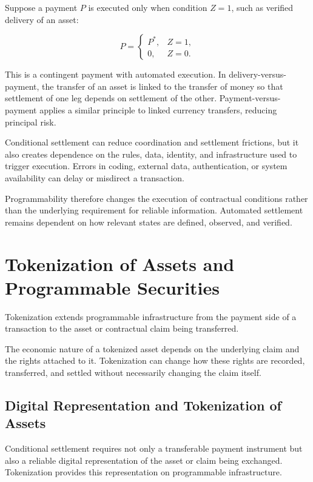 Suppose a payment \(P\) is executed only when condition \(Z=1\), such as verified delivery of an asset:

\begin{equation}
P=
\begin{cases}
P^{*}, & Z=1,\\
0, & Z=0.
\end{cases}
\label{eq:ch24-conditional-payment}
\end{equation}

This is a contingent payment with automated execution. In delivery-versus-payment, the transfer of an asset is linked to the transfer of money so that settlement of one leg depends on settlement of the other. Payment-versus-payment applies a similar principle to linked currency transfers, reducing principal risk.

Conditional settlement can reduce coordination and settlement frictions, but it also creates dependence on the rules, data, identity, and infrastructure used to trigger execution. Errors in coding, external data, authentication, or system availability can delay or misdirect a transaction.

Programmability therefore changes the execution of contractual conditions rather than the underlying requirement for reliable information. Automated settlement remains dependent on how relevant states are defined, observed, and verified.


\section{Tokenization of Assets and Programmable Securities}

Tokenization extends programmable infrastructure from the payment side of a transaction to the asset or contractual claim being transferred.

The economic nature of a tokenized asset depends on the underlying claim and the rights attached to it. Tokenization can change how these rights are recorded, transferred, and settled without necessarily changing the claim itself.

\subsection{Digital Representation and Tokenization of Assets}

Conditional settlement requires not only a transferable payment instrument but also a reliable digital representation of the asset or claim being exchanged. Tokenization provides this representation on programmable infrastructure.

